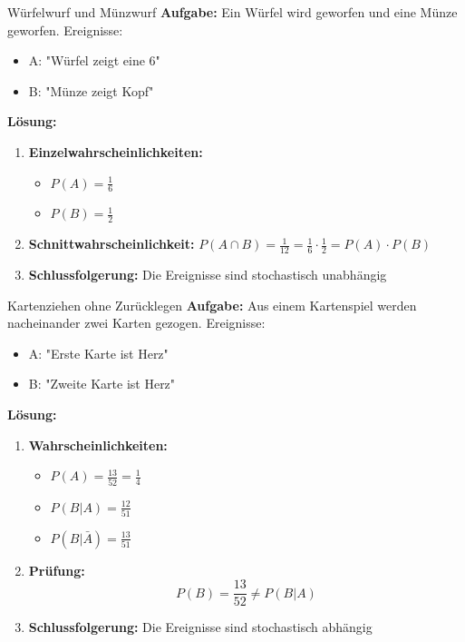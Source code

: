 \begin{example}{Würfelwurf und Münzwurf}
\textbf{Aufgabe:} Ein Würfel wird geworfen und eine Münze geworfen.
Ereignisse:
\begin{itemize}
\item A: "Würfel zeigt eine 6"
\item B: "Münze zeigt Kopf"
\end{itemize}

\textbf{Lösung:}
\begin{enumerate}
\item \textbf{Einzelwahrscheinlichkeiten:}
   \begin{itemize}
   \item $P(A) = \frac{1}{6}$
   \item $P(B) = \frac{1}{2}$
   \end{itemize}

\item \textbf{Schnittwahrscheinlichkeit:}
   $P(A \cap B) = \frac{1}{12} = \frac{1}{6} \cdot \frac{1}{2} = P(A) \cdot P(B)$

\item \textbf{Schlussfolgerung:} Die Ereignisse sind stochastisch unabhängig
\end{enumerate}
\end{example}

\begin{example}{Kartenziehen ohne Zurücklegen}
\textbf{Aufgabe:} Aus einem Kartenspiel werden nacheinander zwei Karten gezogen.
Ereignisse:
\begin{itemize}
\item A: "Erste Karte ist Herz"
\item B: "Zweite Karte ist Herz"
\end{itemize}

\textbf{Lösung:}
\begin{enumerate}
\item \textbf{Wahrscheinlichkeiten:}
   \begin{itemize}
   \item $P(A) = \frac{13}{52} = \frac{1}{4}$
   \item $P(B|A) = \frac{12}{51}$
   \item $P(B|\bar{A}) = \frac{13}{51}$
   \end{itemize}

\item \textbf{Prüfung:}
   $$P(B) = \frac{13}{52} \neq P(B|A)$$

\item \textbf{Schlussfolgerung:} Die Ereignisse sind stochastisch abhängig
\end{enumerate}
\end{example}

